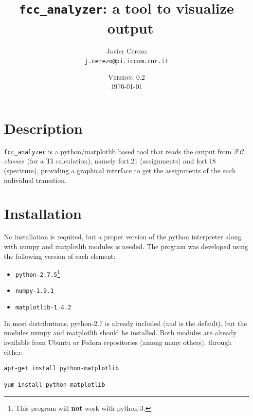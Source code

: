 \documentclass[a4paper,11pt]{article}
\title{\texttt{fcc\_analyzer}: a tool to visualize \fcc\ output}
\date{\textsc{Version: 0.2}\\\today}
\author{Javier Cerezo\\\texttt{j.cerezo@pi.iccom.cnr.it}}
\begin{document}
\newcommand{\fcc}{$\mathcal{FC}$\textit{classes}}

\maketitle

\section{Description}
\texttt{fcc\_analyzer} is a python/matplotlib based tool that reads the output from \fcc\ (for a TI calculation), namely fort.21 (assignments) and fort.18 (spectrum), providing a graphical interface to get the assignments of the each individual transition.

\section{Installation}
No installation is required, but a proper version of the python interpreter along with numpy and matplotlib modules is needed. The program was developed using the following version of each element:

\begin{itemize}
 \item \texttt{python-2.7.5}\footnote{This program will \textbf{not} work with python-3.}
 \item \texttt{numpy-1.9.1}
 \item \texttt{matplotlib-1.4.2}
\end{itemize}

In most distributions, python-2.7 is already included (and is the default), but the modules numpy and matplotlib should be installed. Both modules are already available from Ubuntu or Fedora repositories (among many others), through either:

\begin{minipage}{0.5\textwidth}
 \begin{lstlisting}[label=ubuntu_repo,caption=\texttt{matplotlib} from Ubuntu]
apt-get install python-matplotlib
 \end{lstlisting}
\end{minipage}
\hspace*{0.1cm}
\begin{minipage}{0.45\textwidth}
  \begin{lstlisting}[label=fedora_repo,caption=\texttt{matplotlib} from Fedora]
yum install python-matplotlib
 \end{lstlisting}
\end{minipage}
\end{document}
